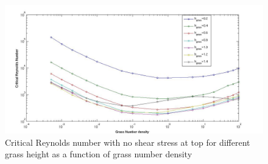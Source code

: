 \documentclass[aps,preprint,floatfix,prl]{revtex4-1}
\begin{document}
\begin{figure}[htb!]
  \includegraphics[scale=0.35]{Instability1_free.jpg}
\caption{Critical Reynolds number with no shear stress at top for different grass height as a function of grass number density}
\end{figure}
\end{document}

